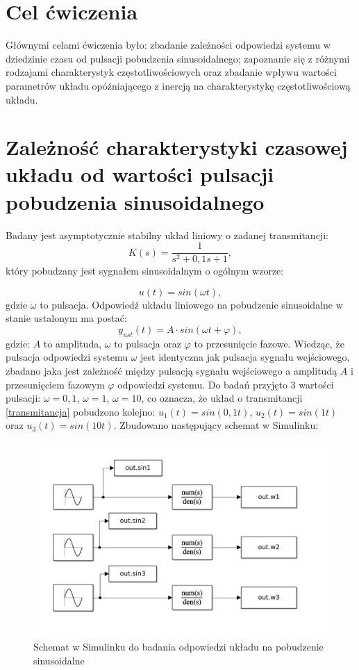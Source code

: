 \documentclass[12pt]{article}
\begin{document}

\tableofcontents
\newpage

\section{Cel ćwiczenia}
Głównymi celami ćwiczenia było: zbadanie zależności odpowiedzi systemu w dziedzinie czasu od pulsacji pobudzenia sinusoidalnego; zapoznanie się z różnymi rodzajami charakterystyk częstotliwościowych oraz zbadanie wpływu wartości parametrów układu opóźniającego z inercją na charakterystykę częstotliwościową układu.


\section{Zależność charakterystyki czasowej układu od wartości pulsacji pobudzenia sinusoidalnego}
Badany jest asymptotycznie stabilny układ liniowy o zadanej transmitancji:
\begin{equation}
    K(s) = \frac{1}{s^2+0,1s+1},
    \label{transmitancja}
\end{equation}
który pobudzany jest sygnałem sinusoidalnym o ogólnym wzorze:

\begin{equation}
    u(t) = sin(\omega t),
\end{equation}
gdzie $\omega$ to pulsacja. Odpowiedź układu liniowego na pobudzenie sinusoidalne w stanie ustalonym ma postać:
\begin{equation}
    y_{ust}(t) = A \cdot sin(\omega t + \varphi),
\end{equation}
gdzie: $A$ to amplituda, $\omega$ to pulsacja oraz $\varphi$ to przesunięcie fazowe. Wiedząc, że pulsacja odpowiedzi systemu $\omega$ jest identyczna jak pulsacja sygnału wejściowego, zbadano jaka jest zależność między pulsacją sygnału wejściowego a amplitudą $A$ i przesunięciem fazowym $\varphi$ odpowiedzi systemu. Do badań przyjęto 3 wartości pulsacji: $\omega = 0,1$, $\omega = 1$, $\omega = 10$, co oznacza, że układ o transmitancji \ref{transmitancja} pobudzono kolejno: $u_1(t) = sin(0,1t)$, $u_2(t) = sin(1t)$ oraz $u_3(t) = sin(10t)$.  Zbudowano następujący schemat w Simulinku:
\begin{figure}[H]
    \centering
    \includegraphics[scale=0.25]{2.png}
    \caption{Schemat w Simulinku do badania odpowiedzi układu na pobudzenie sinusoidalne}
\end{figure}
\end{document}
